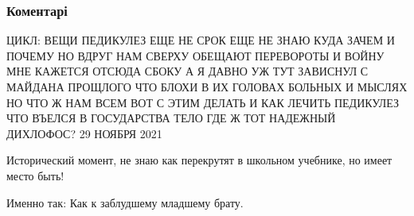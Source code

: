  
 
 
 
 
\subsubsection{Коментарі}
\label{sec:07_12_2021.fb.kiva_ilja.1.terpenie_moskva.cmt}

\begin{itemize} %

\obeycr
ЦИКЛ: ВЕЩИ
ПЕДИКУЛЕЗ
ЕЩЕ НЕ СРОК ЕЩЕ НЕ ЗНАЮ
КУДА ЗАЧЕМ И ПОЧЕМУ
НО ВДРУГ НАМ СВЕРХУ ОБЕЩАЮТ
ПЕРЕВОРОТЫ И ВОЙНУ
МНЕ КАЖЕТСЯ ОТСЮДА СБОКУ
А Я ДАВНО УЖ ТУТ ЗАВИСНУЛ
С МАЙДАНА ПРОЩЛОГО ЧТО БЛОХИ
В ИХ ГОЛОВАХ БОЛЬНЫХ И МЫСЛЯХ
НО ЧТО Ж НАМ ВСЕМ ВОТ С ЭТИМ ДЕЛАТЬ
И КАК ЛЕЧИТЬ ПЕДИКУЛЕЗ
ЧТО ВЪЕЛСЯ В ГОСУДАРСТВА ТЕЛО
ГДЕ Ж ТОТ НАДЕЖНЫЙ ДИХЛОФОС?
29 НОЯБРЯ 2021
\restorecr

Исторический момент, не знаю как перекрутят в школьном учебнике, но имеет место быть!

Именно так:
Как к заблудшему младшему брату.
\end{itemize} %
